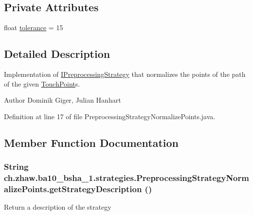 \subsection*{Private Attributes}
\begin{DoxyCompactItemize}
\item 
float \hyperlink{classch_1_1zhaw_1_1ba10__bsha__1_1_1strategies_1_1PreprocessingStrategyNormalizePoints_a0b3e38f03eb2ce52c7e0a1b09c5f0355}{tolerance} = 15
\end{DoxyCompactItemize}


\subsection{Detailed Description}
Implementation of \hyperlink{interfacech_1_1zhaw_1_1ba10__bsha__1_1_1strategies_1_1IPreprocessingStrategy}{IPreprocessingStrategy} that normalizes the points of the path of the given \hyperlink{classch_1_1zhaw_1_1ba10__bsha__1_1_1TouchPoint}{TouchPoint}s.

\begin{DoxyAuthor}{Author}
Dominik Giger, Julian Hanhart 
\end{DoxyAuthor}


Definition at line 17 of file PreprocessingStrategyNormalizePoints.java.

\subsection{Member Function Documentation}
\hypertarget{classch_1_1zhaw_1_1ba10__bsha__1_1_1strategies_1_1PreprocessingStrategyNormalizePoints_a9b2a647c2f4d9702d943dbe8ef43485e}{
\subsubsection[{getStrategyDescription}]{\setlength{\rightskip}{0pt plus 5cm}String ch.zhaw.ba10\_\-bsha\_\-1.strategies.PreprocessingStrategyNormalizePoints.getStrategyDescription ()}}
\label{classch_1_1zhaw_1_1ba10__bsha__1_1_1strategies_1_1PreprocessingStrategyNormalizePoints_a9b2a647c2f4d9702d943dbe8ef43485e}
Return a description of the strategy

